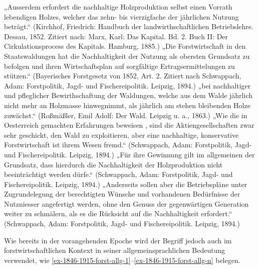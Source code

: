 \documentclass[
    german,
    a4paper,%
    12pt,%
    oneside,%
    toc=bibliography,
    final,
]{scrartcl}
\begin{document}
\begin{exe}
\ex \label{ex-1846-1915-fach-1} „Ausserdem erfordert die nachhaltige Holzproduktion selbst einen Vorrath lebendigen Holzes, welcher das zehn- bis vierzigfache der jährlichen Nutzung beträgt.“ (Kirchhof, Friedrich: Handbuch der landwirthschaftlichen Betriebslehre. Dessau, 1852. Zitiert nach: Marx, Karl: Das Kapital. Bd. 2. Buch II: Der Cirkulationsprocess des Kapitals. Hamburg, 1885.)
\ex „Die Forstwirtschaft in den Staatswaldungen hat die Nachhaltigkeit der Nutzung als obersten Grundsatz zu befolgen und ihren Wirtschaftsplan auf sorgfältige Ertragsermittelungen zu stützen.“ (Bayerisches Forstgesetz von 1852, Art. 2. Zitiert nach Schwappach, Adam: Forstpolitik, Jagd- und Fischereipolitik. Leipzig, 1894.)
\ex „bei nachhaltiger und pfleglicher Bewirthschaftung der Waldungen, welche aus dem Walde jährlich nicht mehr an Holzmasse hinwegnimmt, als jährlich am stehen bleibenden Holze zuwächst.“ (Roßmäßler, Emil Adolf: Der Wald. Leipzig u. a., 1863.)
\ex „Wie die in Oesterreich gemachten Erfahrungen beweisen , sind die Aktiengesellschaften zwar sehr geschickt, den Wald zu exploitieren, aber eine nachhaltige, konservative Forstwirtschaft ist ihrem Wesen fremd.“ (Schwappach, Adam: Forstpolitik, Jagd- und Fischereipolitik. Leipzig, 1894.)
\ex „Für ihre Gewinnung gilt im allgemeinen der Grundsatz, dass hierdurch die Nachhaltigkeit der Holzproduktion nicht beeinträchtigt werden dürfe.“ (Schwappach, Adam: Forstpolitik, Jagd- und Fischereipolitik. Leipzig, 1894.)
\ex \label{ex-1846-1915-fach-n} „Anderseits sollen aber die Betriebspläne unter Zugrundelegung der berechtigten Wünsche und vorhandenen Bedürfnisse der Nutzniesser angefertigt werden, ohne den Genuss der gegenwärtigen Generation weiter zu schmälern, als es die Rücksicht auf die Nachhaltigkeit erfordert.“ (Schwappach, Adam: Forstpolitik, Jagd- und Fischereipolitik. Leipzig, 1894.)
\end{exe}

Wie bereits in der vorangehenden Epoche wird der Begriff jedoch auch im forstwirtschaftlichen Kontext in seiner allgemeinsprachlichen Bedeutung verwendet, wie \ref{ex-1846-1915-forst-allg-1}–\ref{ex-1846-1915-forst-allg-n} belegen.
\end{document}

